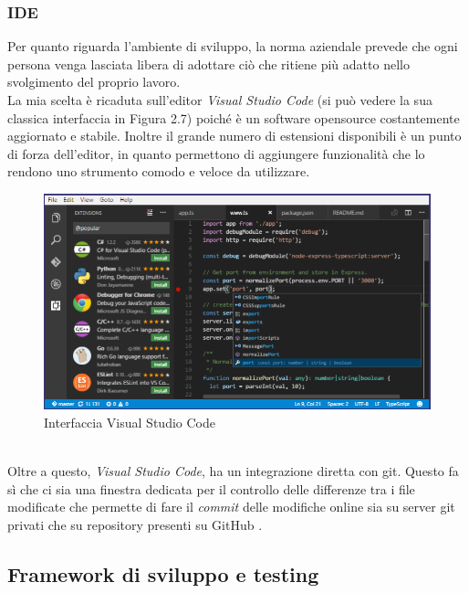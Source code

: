 \subsubsection{IDE}
Per quanto riguarda l'ambiente di sviluppo, la norma aziendale prevede che ogni persona venga lasciata libera di adottare ciò che ritiene più adatto nello svolgimento del proprio lavoro.\\
La mia scelta è ricaduta sull'editor \textit{Visual Studio Code} (si può vedere la sua classica interfaccia in Figura 2.7) poiché è un software \gls{opensource} costantemente aggiornato e stabile. Inoltre il grande numero di estensioni disponibili è un punto di forza dell'editor, in quanto permettono di aggiungere funzionalità che lo rendono uno strumento comodo e veloce da utilizzare.
\begin{figure}[h]
	\centering
	\includegraphics[scale=0.5]{immagini/vsc_interface}
	\caption{Interfaccia Visual Studio Code}
\end{figure}
\\
Oltre a questo, \textit{Visual Studio Code}, ha un integrazione diretta con \gls{git}. Questo fa sì che ci sia una finestra dedicata per il controllo delle differenze tra i file modificate che permette di fare il \textit{commit} delle modifiche online sia su server \gls{git} privati che su \gls{repository} presenti su GitHub \cite{gitGuida, gitSite}.
\subsection{Framework di sviluppo e testing}
